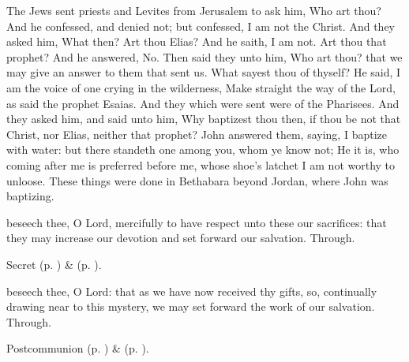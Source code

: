 

 The Jews sent priests and Levites from Jerusalem to ask him, Who art thou? And he confessed, and denied not; but confessed, I am not the Christ. And they asked him, What then? Art thou Elias? And he saith, I am not. Art thou that prophet? And he answered, No. Then said they unto him, Who art thou? that we may give an answer to them that sent us. What sayest thou of thyself? He said, I am the voice of one crying in the wilderness, Make straight the way of the Lord, as said the prophet Esaias. And they which were sent were of the Pharisees. And they asked him, and said unto him, Why baptizest thou then, if thou be not that Christ, nor Elias, neither that prophet? John answered them, saying, I baptize with water: but there standeth one among you, whom ye know not; He it is, who coming after me is preferred before me, whose shoe's latchet I am not worthy to unloose. These things were done in Bethabara beyond Jordan, where John was baptizing.


\secret
{} beseech thee, O Lord, mercifully to have respect unto these our sacrifices: that they may increase our devotion and set forward our salvation. Through.

\begin{rubric}
     Secret  (p. \pageref{AdventISecret}) \&   (p. \pageref{SPMaryInAdvent}).
\end{rubric}


\postcommunion
{} beseech thee, O Lord: that as we have now received thy gifts, so, continually drawing near to this mystery, we may set forward the work of our salvation. Through.

\begin{rubric}
     Postcommunion  (p. \pageref{AdventIPostcommunion}) \&   (p. \pageref{SPMaryInAdvent}).
\end{rubric}


